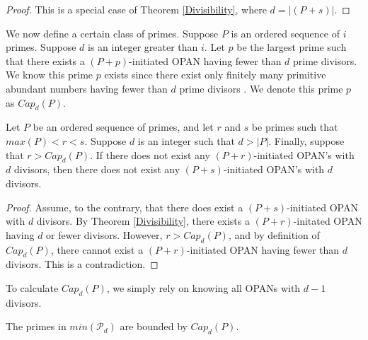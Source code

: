 \documentclass[../paper.tex]{subfiles}
\begin{document}
\begin{proof}
This is a special case of Theorem {\ref{Divisibility}}, where $d = |(P + s)|$.
\end{proof}

We now define a certain class of primes.
Suppose $P$ is an ordered sequence of $i$ primes. Suppose $d$ is
an integer greater than $i$. Let $p$ be the largest prime such 
that there exists a $(P + p)$-initiated OPAN having fewer than $d$ 
prime divisors. We know this prime $p$ exists since 
there exist only finitely many primitive abundant numbers having
fewer than $d$ prime divisors \cite{dickson}. We denote this prime $p$
as $Cap_d(P)$. 

\begin{theorem}\label{cap}
Let $P$ be an ordered sequence of primes, and  let $r$ and $s$ be 
primes such that $max(P) < r < s$. Suppose $d$ is an integer such
that $d > |P|$. Finally, suppose that $r > Cap_d(P)$. If there
does not exist any $(P + r)$-initiated OPAN's with $d$ divisors,
then there does not exist any $(P + s)$-initiated OPAN's with $d$ 
divisors.
\end{theorem}

\begin{proof}
Assume, to the contrary, that there does exist a $(P + 
s)$-initiated OPAN with $d$ divisors. By Theorem {\ref{Divisibility}},
there exists a $(P + r)$-initated OPAN having $d$ or fewer
divisors. However, $r > Cap_d(P)$, and by definition of
$Cap_d(P)$, there cannot exist a $(P + r)$-initiated OPAN having
fewer than $d$ divisors. This is a contradiction.
\end{proof}

To calculate $Cap_d(P)$, we simply rely on knowing all OPANs with $d - 1$ divisors.

\begin{theorem} The primes in $min(\mathcal{P}_d)$ are bounded by $Cap_d(P)$.

\end{theorem}
\end{document}
